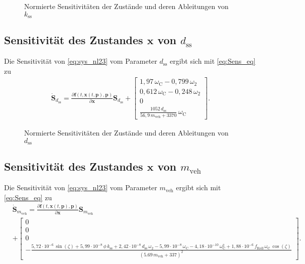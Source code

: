 \begin{figure}
\centering
\newlength\kheight 
\setlength\kheight{8cm}
\newlength\kwidth 
\setlength\kwidth{13cm}

\caption{Normierte Sensitivitäten der Zustände und deren Ableitungen von $k_\mathrm{ss}$}
\label{fig:Sens_k}
\end{figure}


\subsection{Sensitivität des Zustandes $\pmb{x}$ von $d_\mathrm{ss}$}
Die Sensitivität von \eqref{eq:sys_nl23} vom Parameter $d_\mathrm{ss}$ ergibt sich mit \eqref{eq:Sens_eq} zu
\begin{align}
\dot{\pmb{S}}_{d_\mathrm{ss}} = \frac{\partial\pmb{f}(t,\pmb{x}(t,\pmb{p}),\pmb{p})}{\partial \pmb{x}} \pmb{S}_{d_\mathrm{ss}} 
+ \begin{bmatrix} 1,97\,\omega_\mathrm{C} - 0,799\,\omega_\mathrm{2}\\
                  0,612\,\omega_\mathrm{C} - 0,248\,\omega_\mathrm{2}\\
                                                       0\\
 \frac{1052\,d_\mathrm{ss}}{56,9\,m_\mathrm{veh} + 3370}\,\omega_\mathrm{C}\end{bmatrix}.
\end{align}

\begin{figure}
\centering
\newlength\dheight 
\setlength\dheight{8cm}
\newlength\dwidth 
\setlength\dwidth{13cm}

\caption{Normierte Sensitivitäten der Zustände und deren Ableitungen von $d_\mathrm{ss}$}
\label{fig:Sens_d}
\end{figure}

\subsection{Sensitivität des Zustandes $\pmb{x}$ von $m_\mathrm{veh}$}
Die Sensitivität von \eqref{eq:sys_nl23} vom Parameter $m_\mathrm{veh}$ ergibt sich mit \eqref{eq:Sens_eq} zu
\begin{align}
&\dot{\pmb{S}}_{m_\mathrm{veh}} = \frac{\partial\pmb{f}(t,\pmb{x}(t,\pmb{p}),\pmb{p})}{\partial \pmb{x}} \pmb{S}_{m_\mathrm{veh}} \\
&+ \begin{bmatrix} 0 \\ 0 \\ 0 \\ -\frac{5,72\cdot 10^{-6}\,\sin(\zeta) + 5,99\cdot 10^{-8}\,\phi\,k_\mathrm{ss} + 2,42\cdot 10^{-8}\,d_\mathrm{ss}\,\omega_2 - 5,99\cdot 10^{-8}\,\omega_\mathrm{C} - 4,18\cdot 10^{-10}\,\omega_\mathrm{C}^2 + 1,88\cdot 10^{-6}\,f_\mathrm{Roll}\,\omega_\mathrm{C}\,\cos(\zeta)}{(5.69\,m_\mathrm{veh} + 337)^2}\end{bmatrix}.
\end{align}

